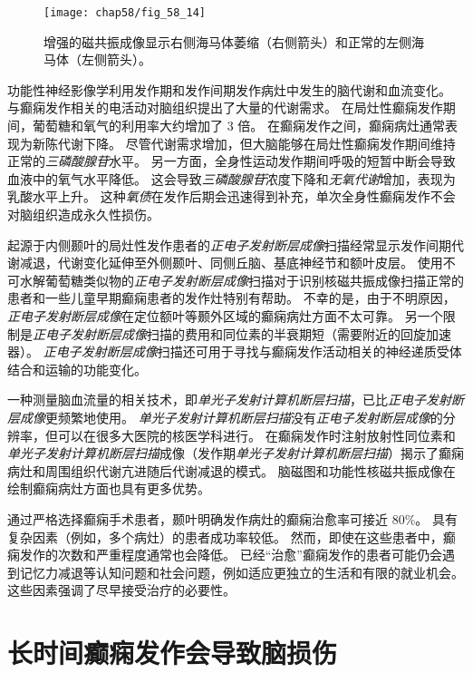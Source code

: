 \begin{figure}[htbp]
	\centering
	\texttt{[image: chap58/fig\_58\_14]}
	\caption{增强的磁共振成像显示右侧海马体萎缩（右侧箭头）和正常的左侧海马体（左侧箭头）。}
	\label{fig:58_14}
\end{figure}


功能性神经影像学利用发作期和发作间期发作病灶中发生的脑代谢和血流变化。
与癫痫发作相关的电活动对脑组织提出了大量的代谢需求。
在局灶性癫痫发作期间，葡萄糖和氧气的利用率大约增加了 3 倍。
在癫痫发作之间，癫痫病灶通常表现为新陈代谢下降。
尽管代谢需求增加，但大脑能够在局灶性癫痫发作期间维持正常的\textit{三磷酸腺苷}水平。
另一方面，全身性运动发作期间呼吸的短暂中断会导致血液中的氧气水平降低。
这会导致\textit{三磷酸腺苷}浓度下降和\textit{无氧代谢}增加，表现为乳酸水平上升。
这种\textit{氧债}在发作后期会迅速得到补充，单次全身性癫痫发作不会对脑组织造成永久性损伤。


起源于内侧颞叶的局灶性发作患者的\textit{正电子发射断层成像}扫描经常显示发作间期代谢减退，代谢变化延伸至外侧颞叶、同侧丘脑、基底神经节和额叶皮层。
使用不可水解葡萄糖类似物的\textit{正电子发射断层成像}扫描对于识别核磁共振成像扫描正常的患者和一些儿童早期癫痫患者的发作灶特别有帮助。
不幸的是，由于不明原因，\textit{正电子发射断层成像}在定位额叶等颞外区域的癫痫病灶方面不太可靠。
另一个限制是\textit{正电子发射断层成像}扫描的费用和同位素的半衰期短（需要附近的回旋加速器）。
\textit{正电子发射断层成像}扫描还可用于寻找与癫痫发作活动相关的神经递质受体结合和运输的功能变化。


一种测量脑血流量的相关技术，即\textit{单光子发射计算机断层扫描}，已比\textit{正电子发射断层成像}更频繁地使用。
\textit{单光子发射计算机断层扫描}没有\textit{正电子发射断层成像}的分辨率，但可以在很多大医院的核医学科进行。
在癫痫发作时注射放射性同位素和\textit{单光子发射计算机断层扫描}成像（发作期\textit{单光子发射计算机断层扫描}）揭示了癫痫病灶和周围组织代谢亢进随后代谢减退的模式。
脑磁图和功能性核磁共振成像在绘制癫痫病灶方面也具有更多优势。


通过严格选择癫痫手术患者，颞叶明确发作病灶的癫痫治愈率可接近 80\%。
具有复杂因素（例如，多个病灶）的患者成功率较低。
然而，即使在这些患者中，癫痫发作的次数和严重程度通常也会降低。
已经“治愈”癫痫发作的患者可能仍会遇到记忆力减退等认知问题和社会问题，例如适应更独立的生活和有限的就业机会。
这些因素强调了尽早接受治疗的必要性。



\section{长时间癫痫发作会导致脑损伤}

